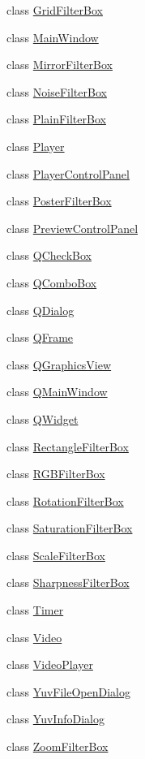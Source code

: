 \begin{DoxyCompactItemize}
class \hyperlink{classGUI_1_1GridFilterBox}{Grid\+Filter\+Box}
\item 
class \hyperlink{classGUI_1_1MainWindow}{Main\+Window}
\item 
class \hyperlink{classGUI_1_1MirrorFilterBox}{Mirror\+Filter\+Box}
\item 
class \hyperlink{classGUI_1_1NoiseFilterBox}{Noise\+Filter\+Box}
\item 
class \hyperlink{classGUI_1_1PlainFilterBox}{Plain\+Filter\+Box}
\item 
class \hyperlink{classGUI_1_1Player}{Player}
\item 
class \hyperlink{classGUI_1_1PlayerControlPanel}{Player\+Control\+Panel}
\item 
class \hyperlink{classGUI_1_1PosterFilterBox}{Poster\+Filter\+Box}
\item 
class \hyperlink{classGUI_1_1PreviewControlPanel}{Preview\+Control\+Panel}
\item 
class \hyperlink{classGUI_1_1QCheckBox}{Q\+Check\+Box}
\item 
class \hyperlink{classGUI_1_1QComboBox}{Q\+Combo\+Box}
\item 
class \hyperlink{classGUI_1_1QDialog}{Q\+Dialog}
\item 
class \hyperlink{classGUI_1_1QFrame}{Q\+Frame}
\item 
class \hyperlink{classGUI_1_1QGraphicsView}{Q\+Graphics\+View}
\item 
class \hyperlink{classGUI_1_1QMainWindow}{Q\+Main\+Window}
\item 
class \hyperlink{classGUI_1_1QWidget}{Q\+Widget}
\item 
class \hyperlink{classGUI_1_1RectangleFilterBox}{Rectangle\+Filter\+Box}
\item 
class \hyperlink{classGUI_1_1RGBFilterBox}{R\+G\+B\+Filter\+Box}
\item 
class \hyperlink{classGUI_1_1RotationFilterBox}{Rotation\+Filter\+Box}
\item 
class \hyperlink{classGUI_1_1SaturationFilterBox}{Saturation\+Filter\+Box}
\item 
class \hyperlink{classGUI_1_1ScaleFilterBox}{Scale\+Filter\+Box}
\item 
class \hyperlink{classGUI_1_1SharpnessFilterBox}{Sharpness\+Filter\+Box}
\item 
class \hyperlink{classGUI_1_1Timer}{Timer}
\item 
class \hyperlink{classGUI_1_1Video}{Video}
\item 
class \hyperlink{classGUI_1_1VideoPlayer}{Video\+Player}
\item 
class \hyperlink{classGUI_1_1YuvFileOpenDialog}{Yuv\+File\+Open\+Dialog}
\item 
class \hyperlink{classGUI_1_1YuvInfoDialog}{Yuv\+Info\+Dialog}
\item 
class \hyperlink{classGUI_1_1ZoomFilterBox}{Zoom\+Filter\+Box}
\end{DoxyCompactItemize}
